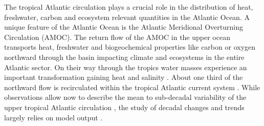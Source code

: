 \documentclass[os, manuscript]{copernicus}
\begin{document}
	
	\introduction  %
	The tropical Atlantic circulation plays a crucial role in the distribution of heat, freshwater, carbon and ecosystem relevant quantities in the Atlantic Ocean. A unique feature of the Atlantic Ocean is the Atlantic Meridional Overturning Circulation (AMOC). The return flow of the AMOC in the upper ocean transports heat, freshwater and biogeochemical properties like carbon or oxygen northward through the basin impacting climate and ecosystems in the entire Atlantic sector. On their way through the tropics water masses experience an important transformation gaining heat \citep[0.22$\,$PW, ][]{Hazeleger2006} and salinity \citep[freshwater divergence of 0.16$\,$Sv,][]{Hazeleger2006}. About one third of the northward flow is recirculated within the tropical Atlantic current system \citep{Hazeleger2006,Tuchen2022}. While observations allow now to describe the mean to sub-decadal variability of the upper tropical Atlantic circulation \cite[e.g.][]{Tuchen2022,Brandt2021a, Burmeister2020}, the study of decadal changes and trends largely relies on model output \cite[e.g.][]{Burmeister2019,Huettl2008,Duteil2014a}. 
	
\end{document}
